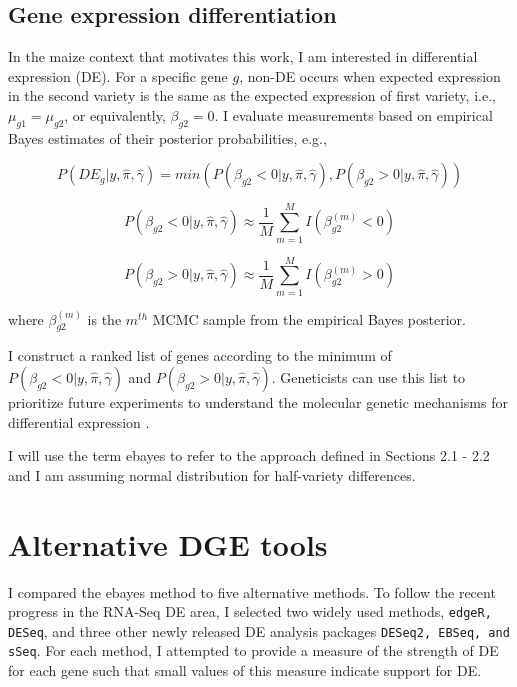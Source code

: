 \subsection{Gene expression differentiation}

In the maize context that motivates this work, I am interested in differential expression (DE). For a specific gene $g$, non-DE occurs when expected expression in the second variety is the same as the expected expression of first variety, i.e., $\mu_{g1} = \mu_{g2}$, or equivalently, $\beta_{g2}=0$.  I evaluate measurements based on empirical Bayes estimates of their posterior probabilities, e.g., 

\begin{equation}
\label{eq:6}
P(DE_g | y, \hat{\pi}, \hat{\gamma}) =min( P(\beta_{g2}< 0 | y, \hat{\pi}, \hat{\gamma}),  P(\beta_{g2}> 0 | y, \hat{\pi}, \hat{\gamma}))
\end{equation}

$$P(\beta_{g2}< 0 | y, \hat{\pi}, \hat{\gamma}) \approx \frac{1}{M} \sum_{m=1}^M I(\beta_{g2} ^ {(m)} < 0)$$

$$P(\beta_{g2}> 0 | y, \hat{\pi}, \hat{\gamma}) \approx \frac{1}{M} \sum_{m=1}^M I(\beta_{g2} ^ {(m)} > 0) $$

where $\beta_{g2}^{(m)}$ is the $m^{th}$ MCMC sample from the empirical Bayes posterior.



I construct a ranked list of genes according to the minimum of $P(\beta_{g2}< 0 | y, \hat{\pi}, \hat{\gamma})$ and $P(\beta_{g2}> 0 | y, \hat{\pi}, \hat{\gamma})$. Geneticists can use this list to prioritize future experiments to understand the molecular genetic mechanisms for differential expression \citep{niemi2015empirical}. 

I will use the term ebayes to refer to the approach defined in Sections 2.1 - 2.2 and I am assuming normal distribution for half-variety differences.

\section{Alternative DGE tools}

I compared the ebayes method to five alternative methods. To follow the recent progress in the RNA-Seq DE area, I selected two widely used methods, {\tt edgeR, DESeq}, and three other newly released DE analysis packages {\tt DESeq2, EBSeq, and sSeq}. For each method, I attempted to provide a measure of the strength of DE for each gene such that small values of this measure indicate support for DE. 


